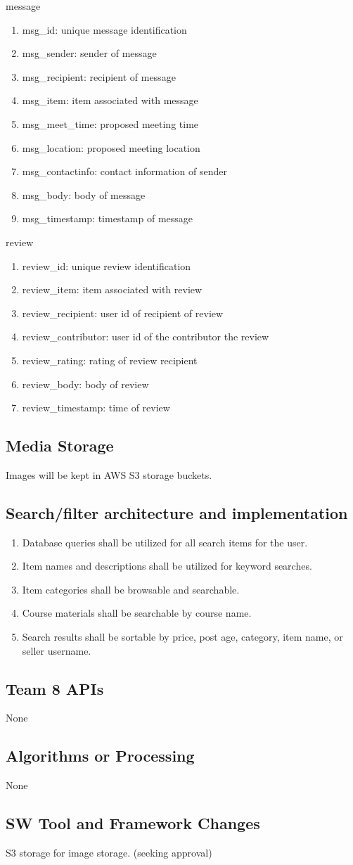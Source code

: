 %
{\large message}
\begin{enumerate}
\item msg\_id: unique message identification
\item msg\_sender: sender of message
\item msg\_recipient: recipient of message
\item msg\_item: item associated with message
\item msg\_meet\_time: proposed meeting time
\item msg\_location: proposed meeting location
\item msg\_contactinfo: contact information of sender
\item msg\_body: body of message
\item msg\_timestamp: timestamp of message
\end{enumerate}%
%
{\large review}
\begin{enumerate}
\item review\_id: unique review identification
\item review\_item: item associated with review
\item review\_recipient: user id of recipient of review
\item review\_contributor: user id of the contributor the review
\item review\_rating: rating of review recipient
\item review\_body: body of review
\item review\_timestamp: time of review
\end{enumerate}%

\subsection{Media Storage}
Images will be kept in AWS S3 storage buckets.

\subsection{Search/filter architecture and implementation}
\begin{enumerate}
\item Database queries shall be utilized for all search items for the user.
\item Item names and descriptions shall be utilized for keyword searches.
\item Item categories shall be browsable and searchable.
\item Course materials shall be searchable by course name.
\item Search results shall be sortable by price, post age, category, item name, or seller username.
\end{enumerate}

\subsection{Team 8 APIs}
None

\subsection{Algorithms or Processing}
None

\subsection{SW Tool and Framework Changes}
S3 storage for image storage. (seeking approval)
